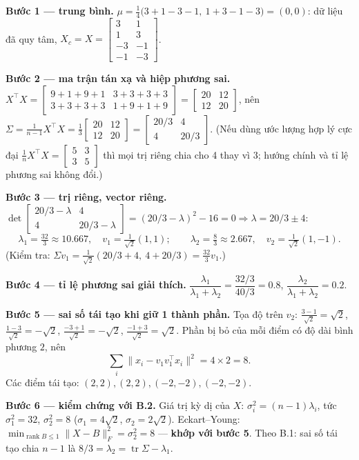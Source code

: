 \textbf{Bước 1 --- trung bình.} \(\mu=\frac14\big(3+1-3-1,\ 1+3-1-3\big)=(0,0)\): dữ liệu đã quy tâm, \(X_c=X=\begin{bmatrix}3&1\\1&3\\-3&-1\\-1&-3\end{bmatrix}\).

\textbf{Bước 2 --- ma trận tán xạ và hiệp phương sai.} \(X^\top X=\begin{bmatrix}9+1+9+1 & 3+3+3+3\\ 3+3+3+3 & 1+9+1+9\end{bmatrix}=\begin{bmatrix}20&12\\12&20\end{bmatrix}\), nên \(\Sigma=\frac1{n-1}X^\top X=\frac13\begin{bmatrix}20&12\\12&20\end{bmatrix}=\begin{bmatrix}20/3&4\\4&20/3\end{bmatrix}\). (Nếu dùng ước lượng hợp lý cực đại \(\frac1n X^\top X=\begin{bmatrix}5&3\\3&5\end{bmatrix}\) thì mọi trị riêng chia cho 4 thay vì 3; hướng chính và tỉ lệ phương sai không đổi.)

\textbf{Bước 3 --- trị riêng, vector riêng.} \(\det\begin{bmatrix}20/3-\lambda&4\\4&20/3-\lambda\end{bmatrix}=(20/3-\lambda)^2-16=0\Rightarrow\lambda=20/3\pm4\): \[\lambda_1=\tfrac{32}3\approx10.667,\quad v_1=\tfrac1{\sqrt2}(1,1);\qquad \lambda_2=\tfrac83\approx2.667,\quad v_2=\tfrac1{\sqrt2}(1,-1).\] (Kiểm tra: \(\Sigma v_1=\frac1{\sqrt2}(20/3+4,\ 4+20/3)=\frac{32}3v_1\).)

\textbf{Bước 4 --- tỉ lệ phương sai giải thích.} \(\dfrac{\lambda_1}{\lambda_1+\lambda_2}=\dfrac{32/3}{40/3}=0.8\), \(\dfrac{\lambda_2}{\lambda_1+\lambda_2}=0.2\).

\textbf{Bước 5 --- sai số tái tạo khi giữ 1 thành phần.} Tọa độ trên \(v_2\): \(\frac{3-1}{\sqrt2}=\sqrt2\), \(\frac{1-3}{\sqrt2}=-\sqrt2\), \(\frac{-3+1}{\sqrt2}=-\sqrt2\), \(\frac{-1+3}{\sqrt2}=\sqrt2\). Phần bị bỏ của mỗi điểm có độ dài bình phương \(2\), nên \[\sum_i\|x_i-v_1v_1^\top x_i\|^2=4\times2=8 .\] Các điểm tái tạo: \((2,2),(2,2),(-2,-2),(-2,-2)\).

\textbf{Bước 6 --- kiểm chứng với B.2.} Giá trị kỳ dị của \(X\): \(\sigma_i^2=(n-1)\lambda_i\), tức \(\sigma_1^2=32\), \(\sigma_2^2=8\) (\(\sigma_1=4\sqrt2\), \(\sigma_2=2\sqrt2\)). Eckart--Young: \(\min_{\operatorname{rank}B\le1}\|X-B\|_F^2=\sigma_2^2=8\) --- \textbf{khớp với bước 5}. Theo B.1: sai số tái tạo chia \(n-1\) là \(8/3=\lambda_2=\operatorname{tr}\Sigma-\lambda_1\).
